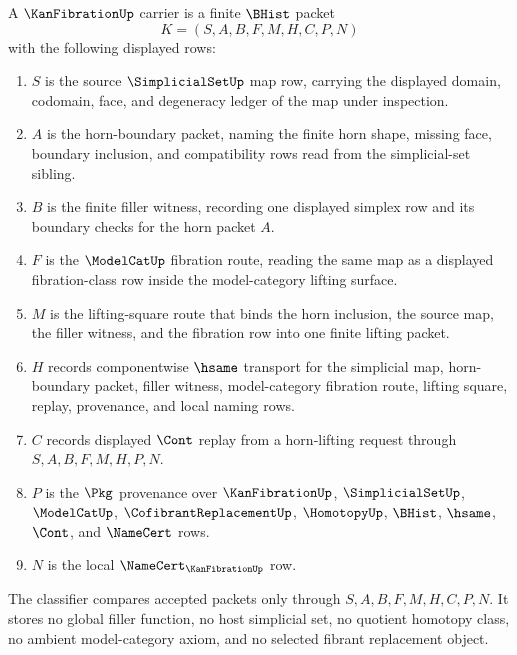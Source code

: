 \begin{definition}
\label{def:kan-fibration-carrier}
A $\KanFibrationUp$ carrier is a finite $\BHist$ packet
$$
K=(S,A,B,F,M,H,C,P,N)
$$
with the following displayed rows:
\begin{enumerate}
\item $S$ is the source $\SimplicialSetUp$ map row, carrying the displayed domain, codomain, face, and degeneracy ledger of the map under inspection.
\item $A$ is the horn-boundary packet, naming the finite horn shape, missing face, boundary inclusion, and compatibility rows read from the simplicial-set sibling.
\item $B$ is the finite filler witness, recording one displayed simplex row and its boundary checks for the horn packet $A$.
\item $F$ is the $\ModelCatUp$ fibration route, reading the same map as a displayed fibration-class row inside the model-category lifting surface.
\item $M$ is the lifting-square route that binds the horn inclusion, the source map, the filler witness, and the fibration row into one finite lifting packet.
\item $H$ records componentwise $\hsame$ transport for the simplicial map, horn-boundary packet, filler witness, model-category fibration route, lifting square, replay, provenance, and local naming rows.
\item $C$ records displayed $\Cont$ replay from a horn-lifting request through $S,A,B,F,M,H,P,N$.
\item $P$ is the $\Pkg$ provenance over $\KanFibrationUp$, $\SimplicialSetUp$, $\ModelCatUp$, $\CofibrantReplacementUp$, $\HomotopyUp$, $\BHist$, $\hsame$, $\Cont$, and $\NameCert$ rows.
\item $N$ is the local $\NameCert_{\KanFibrationUp}$ row.
\end{enumerate}
The classifier compares accepted packets only through $S,A,B,F,M,H,C,P,N$. It stores no global filler function, no host simplicial set, no quotient homotopy class, no ambient model-category axiom, and no selected fibrant replacement object.
\end{definition}

